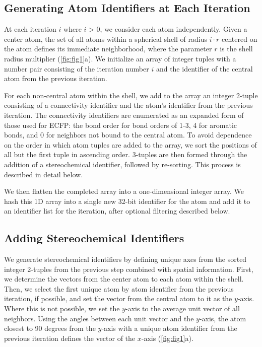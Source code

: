 \documentclass[../main.tex]{subfiles}
\begin{document}
\begin{refsection}
\subsection*{Generating Atom Identifiers at Each Iteration}

At each iteration $i$ where $i$ \textgreater{} 0, we consider each atom independently.
Given a center atom, the set of all atoms within a spherical shell of radius $i \cdot r$ centered on the atom defines its immediate neighborhood, where the parameter $r$ is the shell radius multiplier (\cref{fig:fig1}a).
We initialize an array of integer tuples with a number pair consisting of the iteration number $i$ and the identifier of the central atom from the previous iteration.

For each non-central atom within the shell, we add to the array an integer 2-tuple consisting of a connectivity identifier and the atom's identifier from the previous iteration.
The connectivity identifiers are enumerated as an expanded form of those used for ECFP: the bond order for bond orders of 1-3, 4 for aromatic bonds, and 0 for neighbors not bound to the central atom.
To avoid dependence on the order in which atom tuples are added to the array, we sort the positions of all but the first tuple in ascending order.
3-tuples are then formed through the addition of a stereochemical identifier, followed by re-sorting.
This process is described in detail below.

We then flatten the completed array into a one-dimensional integer array.
We hash this 1D array into a single new 32-bit identifier for the atom and add it to an identifier list for the iteration, after optional filtering described below.

\subsection*{Adding Stereochemical Identifiers}

We generate stereochemical identifiers by defining unique axes from the sorted integer 2-tuples from the previous step combined with spatial information.
First, we determine the vectors from the center atom to each atom within the shell.
Then, we select the first unique atom by atom identifier from the previous iteration, if possible, and set the vector from the central atom to it as the $y$-axis.
Where this is not possible, we set the $y$-axis to the average unit vector of all neighbors.
Using the angles between each unit vector and the  $y$-axis, the atom closest to 90 degrees from the $y$-axis with a unique atom identifier from the previous iteration defines the vector of the $x$-axis (\cref{fig:fig1}a).


\end{refsection}
\end{document}
